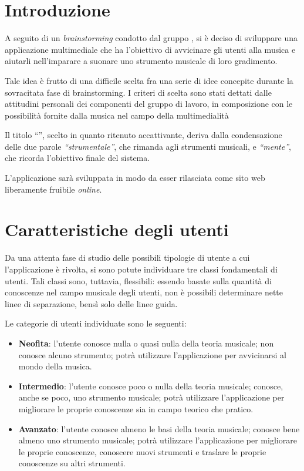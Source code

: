 \section{Introduzione}
A seguito di un \textit{brainstorming} condotto dal gruppo \theteam{}, si è deciso di sviluppare una applicazione multimediale che ha l'obiettivo di avvicinare gli utenti alla musica e aiutarli nell'imparare a suonare uno strumento musicale di loro gradimento.

Tale idea è frutto di una difficile scelta fra una serie di idee concepite durante la sovracitata fase di brainstorming. I criteri di scelta sono stati dettati dalle attitudini personali dei componenti del gruppo di lavoro, in composizione con le possibilità fornite dalla musica nel campo della multimedialità

Il titolo ``\ProjectTitle{}'', scelto in quanto ritenuto accattivante, deriva dalla condensazione delle due parole \emph{``strumentale''}, che rimanda agli strumenti musicali, e \emph{``mente''}, che ricorda l'obiettivo finale del sistema.

L'applicazione sarà sviluppata in modo da esser rilasciata come sito web liberamente fruibile \emph{online}.

\section{Caratteristiche degli utenti}
Da una attenta fase di studio delle possibili tipologie di utente a cui l'applicazione è rivolta, si sono potute individuare tre classi fondamentali di utenti. Tali classi sono, tuttavia, flessibili: essendo basate sulla quantità di conoscenze nel campo musicale degli utenti, non è possibili determinare nette linee di separazione, bensì solo delle linee guida.

Le categorie di utenti individuate sono le seguenti:
\begin{itemize}
	\item \textbf{Neofita}: l'utente conosce nulla o quasi nulla della teoria musicale; non conosce alcuno strumento; potrà utilizzare l'applicazione per avvicinarsi al mondo della musica.
	\item \textbf{Intermedio}: l'utente conosce poco o nulla della teoria musicale; conosce, anche se poco, uno strumento musicale; potrà utilizzare l'applicazione per migliorare le proprie conoscenze sia in campo teorico che pratico.
	\item \textbf{Avanzato}: l'utente conosce almeno le basi della teoria musicale; conosce bene almeno uno strumento musicale; potrà utilizzare l'applicazione per migliorare le proprie conoscenze, conoscere nuovi strumenti e traslare le proprie conoscenze su altri strumenti.
\end{itemize}

